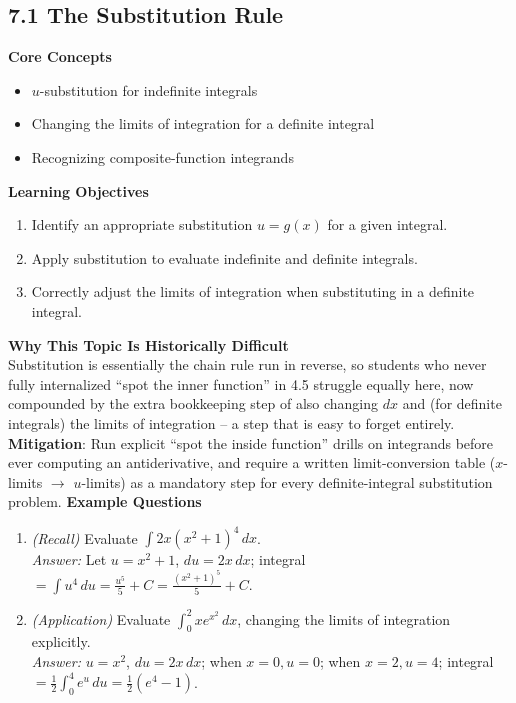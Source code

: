 \documentclass[11pt]{article}
\begin{document}
\subsection{7.1 The Substitution Rule}
\textbf{Core Concepts}
\begin{itemize}
\item $u$-substitution for indefinite integrals
\item Changing the limits of integration for a definite integral
\item Recognizing composite-function integrands
\end{itemize}
\textbf{Learning Objectives}
\begin{enumerate}
\item Identify an appropriate substitution $u=g(x)$ for a given integral.
\item Apply substitution to evaluate indefinite and definite integrals.
\item Correctly adjust the limits of integration when substituting in a definite integral.
\end{enumerate}
\textbf{Why This Topic Is Historically Difficult} \\
Substitution is essentially the chain rule run in reverse, so students who never fully internalized ``spot the inner function'' in 4.5 struggle equally here, now compounded by the extra bookkeeping step of also changing $dx$ and (for definite integrals) the limits of integration -- a step that is easy to forget entirely. \\
\textbf{Mitigation}: Run explicit ``spot the inside function'' drills on integrands before ever computing an antiderivative, and require a written limit-conversion table ($x$-limits $\to$ $u$-limits) as a mandatory step for every definite-integral substitution problem.
\textbf{Example Questions}
\begin{enumerate}
\item \emph{(Recall)} Evaluate $\displaystyle\int 2x(x^2+1)^4\,dx$. \\
\textit{Answer:} Let $u=x^2+1$, $du=2x\,dx$; integral $=\int u^4\,du = \tfrac{u^5}{5}+C = \tfrac{(x^2+1)^5}{5}+C$.
\item \emph{(Application)} Evaluate $\displaystyle\int_0^{2} x e^{x^2}\,dx$, changing the limits of integration explicitly. \\
\textit{Answer:} $u=x^2$, $du=2x\,dx$; when $x=0, u=0$; when $x=2, u=4$; integral $=\tfrac12\int_0^4 e^u\,du = \tfrac12(e^4-1)$.
\end{enumerate}
\end{document}
